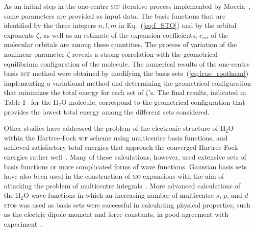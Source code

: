  
As an initial step in the one-centre \textsc{scf} iterative process
implemented by
Moccia~\cite{Moccia_JCP_2164,Moccia_JCP_2176,Moccia_1964}, some
parameters are provided as input data. The basis functions that are
identified by the three integers $n,l,m$ in Eq.~(\ref{eq:f_STO}) and
by the orbital exponents $\zeta$, as well as an estimate of the
expansion coefficients, $c_{si}$, of the molecular orbitals are among
these quantities. The process of variation of the nonlinear parameter
$\zeta$ reveals a strong correlation with the geometrical equilibrium
configuration of the molecule. The numerical results of the one-centre
basis \textsc{scf} method were obtained by modifying the basis
sets~(\ref{eq:lcao_roothaan}) implementing a variational method and
determining the geometrical configuration that minimizes the total
energy for each set of $\zeta$'s. The final results, indicated in
Table I~\cite{Moccia_1964} for the H$_{2}$O molecule, correspond to
the geometrical configuration that provides the lowest total energy
among the different sets considered.








Other studies have addressed the problem of the electronic structure
of H$_{2}$O within the Hartree-Fock \textsc{scf} scheme using
multicentre basis functions, and achieved satisfactory total energies
that approach the converged Hartree-Fock energies rather
well~\cite{natureH2O_1960, gaussianH2O_1965,
  Moccia_oneCenterHF_1967,Reeves_nature_1956}. Many of these
calculations, however, used extensive sets of basis functions or more
complicated forms of wave functions. Gaussian basis sets have also
been used in the construction of \textsc{mo} expansions with the aim
of attacking the problem of multicentre
integrals~\cite{gaussianH2O_1965,Neumann_gaussian_1968}. More advanced
calculations of the H$_{2}$O wave functions in which an increasing
number of multicentre $s$, $p$, and $d$ \textsc{sto}s was used as
basis sets were successful in calculating physical properties, such as
the electric dipole moment and force constants, in good agreement with
experiment~\cite{Pitzer_1968,Pitzer_1970}.











